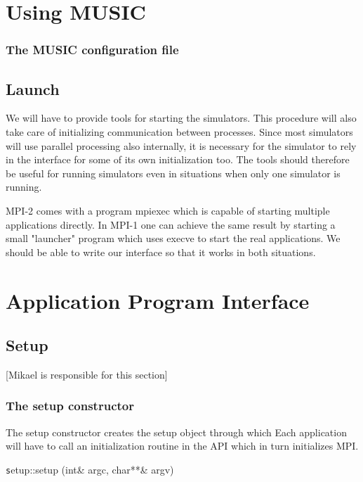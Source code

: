 \documentclass[a4paper]{report}
\newenvironment{metatext}%
{\color{blue}}%
{}
\newenvironment{head}%
{\texttt}%
{}
\newcommand{\responsible}[1]%
{{\color{red}[#1 is responsible for this section]}}
\begin{document}
\chapter{Using MUSIC}

\subsection{The MUSIC configuration file}

\section{Launch}

We will have to provide tools for starting the simulators.  This
procedure will also take care of initializing communication between
processes.  Since most simulators will use parallel processing also
internally, it is necessary for the simulator to rely in the interface
for some of its own initialization too.  The tools should therefore be
useful for running simulators even in situations when only one
simulator is running.

\begin{metatext}
  MPI-2 comes with a program mpiexec which is capable of starting
  multiple applications directly.  In MPI-1 one can achieve the same
  result by starting a small "launcher" program which uses execve to
  start the real applications.  We should be able to write our interface
  so that it works in both situations.
\end{metatext}

\chapter{Application Program Interface}

\section{Setup}
\responsible{Mikael}

\subsection{The setup constructor}

The setup constructor creates the setup object through which
Each application will have to call an initialization routine in the API
which in turn initializes MPI.

\begin{head}
  setup::setup (int\& argc, char**\& argv)
\end{head}
\end{document}
